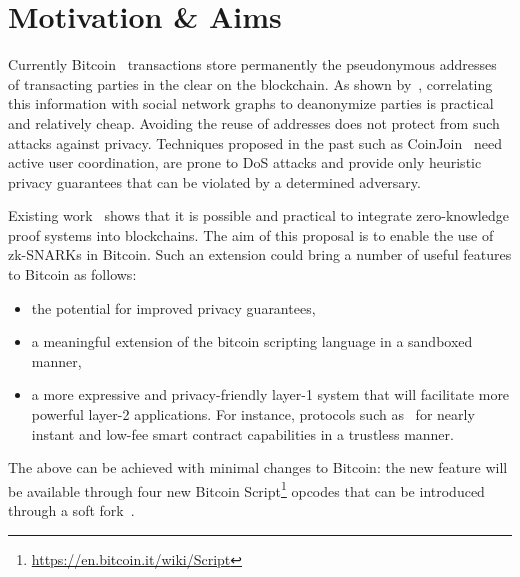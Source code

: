 \section{Motivation \& Aims}
  Currently Bitcoin~\cite{bitcoin} transactions store permanently the
  pseudonymous addresses of transacting parties in the clear on the blockchain.
  As shown by~\cite{DBLP:conf/fc/AndroulakiKRSC13}, correlating this information
  with social network graphs to deanonymize parties is practical and relatively
  cheap. Avoiding the reuse of addresses does not protect from such attacks
  against privacy. Techniques proposed in the past such as
  CoinJoin~\cite{DBLP:conf/trustcom/MaurerNF17} need active user coordination,
  are prone to DoS attacks and provide only heuristic privacy guarantees that
  can be violated by a determined adversary.

  Existing work~\cite{DBLP:conf/sp/Ben-SassonCG0MTV14,zcash-protocol,kachina}
  shows that it is possible and practical to integrate zero-knowledge proof
  systems into blockchains. The aim of this proposal is to enable the use of
  zk-SNARKs in Bitcoin. Such an extension could bring a number of useful
  features to Bitcoin as follows: %
  \begin{itemize}
    \item the potential for improved privacy guarantees,
    \item a meaningful extension of the bitcoin scripting language in a sandboxed manner,
    \item a more expressive and privacy-friendly layer-1 system that will facilitate more powerful layer-2 applications. For instance, protocols such as~\cite{DBLP:conf/sss/DeckerW15,lightning,perun,DBLP:conf/systor/LindNEKPS18,sprites}
    for nearly instant and low-fee smart contract capabilities in a trustless
    manner.
  \end{itemize}
  The above can be achieved with minimal changes to Bitcoin: the new feature
  will be available through four new Bitcoin
  Script\footnote{\url{https://en.bitcoin.it/wiki/Script}} opcodes that can be
  introduced through a soft fork~\cite{DBLP:conf/fc/ZamyatinSJSWK18}.
